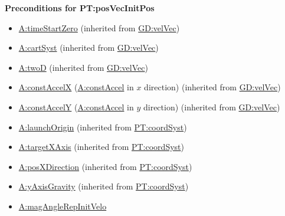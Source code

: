 \documentclass[12pt]{article}
\begin{document}
\noindent \textbf{Preconditions for PT:posVecInitPos} 
\begin{itemize} 
\item \hyperref[timeStartZero]{A:timeStartZero} (inherited from
\hyperref[GD:velVec]{GD:velVec}) \item \hyperref[cartSyst]{A:cartSyst}
(inherited from \hyperref[GD:velVec]{GD:velVec}) \item \hyperref[twoD]{A:twoD}
(inherited from \hyperref[GD:velVec]{GD:velVec}) \item
\hyperref[constAccelX]{A:constAccelX} (\hyperref[constAccel]{A:constAccel} in
$x$ direction) (inherited from \hyperref[GD:velVec]{GD:velVec}) \item
\hyperref[constAccelY]{A:constAccelY} (\hyperref[constAccel]{A:constAccel} in
$y$ direction) (inherited from \hyperref[GD:velVec]{GD:velVec}) \item
\hyperref[launchOrigin]{A:launchOrigin} (inherited from
\hyperref[PT:coordSyst]{PT:coordSyst}) \item
\hyperref[targetXAxis]{A:targetXAxis} (inherited from
\hyperref[PT:coordSyst]{PT:coordSyst}) \item
\hyperref[posXDirection]{A:posXDirection} (inherited from
\hyperref[PT:coordSyst]{PT:coordSyst}) \item
\hyperref[yAxisGravity]{A:yAxisGravity} (inherited from
\hyperref[PT:coordSyst]{PT:coordSyst}) \item
\hyperref[magAngleRepInitVelo]{A:magAngleRepInitVelo} 
\end{itemize} 
\end{document}
